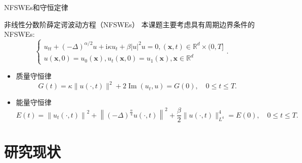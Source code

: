 \documentclass[aspectratio=169]{beamer}
\numberwithin{theorem}{section} %
\numberwithin{equation}{section}%
\numberwithin{figure}{section}%
\numberwithin{table}{section}%
\begin{document}
\begin{frame}{NFSWEs和守恒定律}
	\begin{block}{非线性分数阶薛定谔波动方程（NFSWEs）}
		本课题主要考虑具有周期边界条件的 NFSWEs:
		{\color{purple}\begin{equation}
			\left\{\begin{array}{l}
				u_{t t}+(-\Delta)^{\alpha / 2} u+\mathrm{i} \kappa u_t+\beta|u|^2 u=0,(\boldsymbol{x}, t) \in \mathbb{R}^d \times(0, T] \\
				u(\boldsymbol{x}, 0)=u_0(\boldsymbol{x}), u_t(\boldsymbol{x}, 0)=u_1(\boldsymbol{x}), \boldsymbol{x} \in \mathbb{R}^d
				\end{array}\right..
		\end{equation}}
		\vspace{-5mm}
		\begin{itemize}
		\item 质量守恒律
		\begin{equation}
			G(t)=\kappa\|u(\cdot, t)\|^2+2 \operatorname{Im}\left(u_t, u\right) = G(0), \quad 0 \leq t \leq T.
		\end{equation}
		\item 能量守恒律
		\begin{equation}\label{eq:10}
			E(t)=\left\|u_t(\cdot, t)\right\|^2+\left\|(-\Delta)^{\frac{\alpha}{4}} u(\cdot, t)\right\|^2+\frac{\beta}{2}\|u(\cdot, t)\|_{L^4}^4 = E(0), \quad 0 \leq t \leq T.
		\end{equation}
	\end{itemize}
	  \end{block}
\end{frame}


\section{研究现状}
\end{document}
